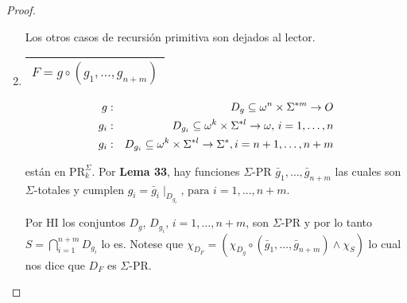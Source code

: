 \begin{proof}
\begin{enumerate}
        \par Los otros casos de recursión primitiva son dejados al lector.

      \item \begin{tabular}{|c|} \hline $F = g \circ (g_{1}, \dotsc, g_{n+m})$\\\hline \end{tabular}
        \begin{eqnarray}
          \nonumber g &:& D_{g} \subseteq \omega^{n} \times \Sigma^{\ast m} \rightarrow O \\
          \nonumber g_{i} &:& D_{g_{i}} \subseteq \omega^{k} \times \Sigma^{\ast l} \rightarrow \omega \text{, } i = 1,
          \dotsc, n \\
          \nonumber g_{i} &:& D_{g_{i}} \subseteq \omega^{k} \times \Sigma^{\ast l} \rightarrow \Sigma^{\ast}, i = n + 1,
          \dotsc, n + m
        \end{eqnarray}

        \par están en $\mathrm{PR}_{k}^{\Sigma}$. Por \textbf{Lema 33}, hay funciones $\Sigma$-PR $\bar{g}_{1}, \dotsc,
        \bar{g}_{n+m}$ las cuales son $\Sigma$-totales y cumplen $g_{i} = \bar{g}_{i} \mid_{D_{g_{i}}} \text{, para }
        i = 1, \dotsc, n + m$.

        \par Por HI los conjuntos $D_{g}$, $D_{g_{i}}$, $i = 1, \dotsc, n + m$, son $\Sigma$-PR y por lo tanto
        $S = \bigcap_{i=1}^{n+m} D_{g_{i}}$ lo es. Notese que $\chi_{D_{F}} = (\chi_{D_{g}} \circ (\bar{g}_{1}, \dotsc,
        \bar{g}_{n+m}) \wedge \chi_{S})$ lo cual nos dice que $D_{F}$ es $\Sigma$-PR.
    \end{enumerate}
  \end{proof}
